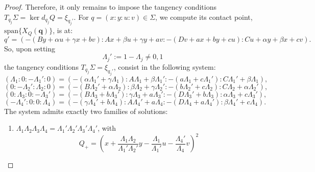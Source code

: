 \documentclass{article}
\begin{document}
\begin{proof}

Therefore, it only remains to impose the tangency conditions $T_{q_j}\Sigma = \ker d_{q_j}Q = \xi _{q_j'}$. For $q = (x:y:u:v)\in \Sigma$, we compute its contact point, $\text{span}\{ X_Q({\boldsymbol{q}})\}$, is at:
     \[ q' = (-(By+\alpha u + \gamma x + bv): Ax+\beta u + \gamma y + av : -(Dv+ax+by+cu): Cu + \alpha y + \beta x  + cv).\]
     So, upon setting
     \[ \Lambda_j' := 1-\Lambda_j\ne 0,1 \]
     the tangency conditions $T_{q_j}\Sigma = \xi_{q_j'}$, consist in the following system:
     \[   (\Lambda_1:0: -\Lambda_1':0) = (-(\alpha \Lambda_1' + \gamma \Lambda_1): A\Lambda_1+\beta \Lambda_1' : -(a\Lambda_1 +c\Lambda_1'): C\Lambda_1' + \beta \Lambda_1), \]
     \[  (0:-\Lambda_2':\Lambda_2:0) = (-(B\Lambda_2'+\alpha \Lambda_2): \beta \Lambda_2 + \gamma \Lambda_2' : -(b\Lambda_2'+c\Lambda_2): C\Lambda_2+ \alpha \Lambda_2' ), \]
     \[ (0:\Lambda_3:0:-\Lambda_3') = (-(B\Lambda_3  + b\Lambda_3'):  \gamma \Lambda_3 + a\Lambda_3' : -(D\Lambda_3'+b\Lambda_3):  \alpha \Lambda_3 + c\Lambda_3'),\]
     \[  (-\Lambda_4':0:0:\Lambda_4) = (-( \gamma \Lambda_4' + b\Lambda_4): A\Lambda_4' + a\Lambda_4 : -(D\Lambda_4 +a\Lambda_4' ):  \beta \Lambda_4'  + c\Lambda_4).\]
     The system admits exactly two families of solutions:
      \begin{enumerate}
         \item $\Lambda_1\Lambda_2\Lambda_3\Lambda_4 = \Lambda_1'\Lambda_2'\Lambda_3'\Lambda_4'$, with
    \[ Q_+ = \left(x + \frac{\Lambda_1\Lambda_2}{\Lambda_1'\Lambda_2'}y - \frac{\Lambda_1}{\Lambda_1'}u - \frac{\Lambda_4'}{\Lambda_4}v \right)^2  \]

\end{enumerate}
\end{proof}
\end{document}
